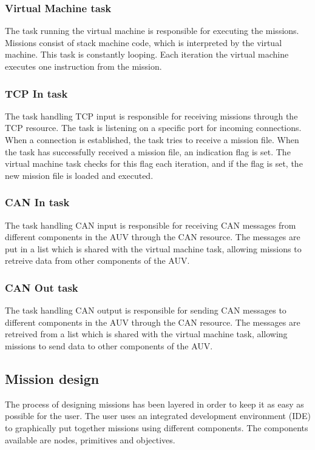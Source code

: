\subsubsection{Virtual Machine task}
The task running the virtual machine is responsible for executing the missions. Missions consist of stack machine code, which is interpreted by the virtual machine. This task is constantly looping. Each iteration the virtual machine executes one instruction from the mission.

\subsubsection{TCP In task}
The task handling TCP input is responsible for receiving missions through the TCP resource. The task is listening on a specific port for incoming connections. When a connection is established, the task tries to receive a mission file. When the task has successfully received a mission file, an indication flag is set. The virtual machine task checks for this flag each iteration, and if the flag is set, the new mission file is loaded and executed.

\subsubsection{CAN In task}
The task handling CAN input is responsible for receiving CAN messages from different components in the AUV through the CAN resource. The messages are put in a list which is shared with the virtual machine task, allowing missions to retreive data from other components of the AUV.

\subsubsection{CAN Out task}
The task handling CAN output is responsible for sending CAN messages to different components in the AUV through the CAN resource. The messages are retreived from a list which is shared with the virtual machine task, allowing missions to send data to other components of the AUV.

\subsection{Mission design}
The process of designing missions has been layered in order to keep it as easy as possible for the user. The user uses an integrated development environment (IDE) to graphically put together missions using different components. The components available are nodes, primitives and objectives.

